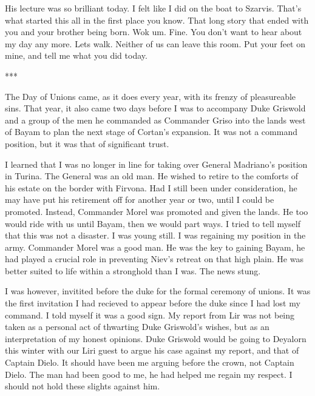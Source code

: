 \documentclass{article}
\begin{document}
His lecture was so brilliant today. I felt like I did on the boat to Szarvis. That's what started this all in the first place you know. That long story that ended with you and your brother being born. Wok um. Fine. You don't want to hear about my day any more. Lets walk. Neither of us can leave this room. Put your feet on mine, and tell me what you did today.

***

The Day of Unions came, as it does every year, with its frenzy of pleasureable sins. That year, it also came two days before I was to accompany Duke Griswold and a group of the men he commanded as Commander Griso into the lands west of Bayam to plan the next stage of Cortan's expansion. It was not a command position, but it was that of significant trust. 

I learned that I was no longer in line for taking over General Madriano's position in Turina. The General was an old man. He wished to retire to the comforts of his estate on the border with Firvona. Had I still been under consideration, he may have put his retirement off for another year or two, until I could be promoted. Instead, Commander Morel was promoted and given the lands. He too would ride with us until Bayam, then we would part ways. I tried to tell myself that this was not a disaster. I was young still. I was regaining my position in the army. Commander Morel was a good man. He was the key to gaining Bayam, he had played a crucial role in preventing Niev's retreat on that high plain. He was better suited to life within a stronghold than I was. The news stung.

I was however, invitited before the duke for the formal ceremony of unions. It was the first invitation I had recieved to appear before the duke since I had lost my command. I told myself it was a good sign. My report from Lir was not being taken as a personal act of thwarting Duke Griswold's wishes, but as an interpretation of my honest opinions. Duke Griswold would be going to Deyalorn this winter with our Liri guest to argue his case against my report, and that of Captain Dielo. It should have been me arguing before the crown, not Captain Dielo. The man had been good to me, he had helped me regain my respect. I should not hold these slights against him. 
\end{document}
